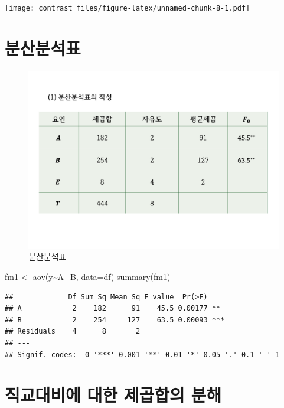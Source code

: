 \documentclass[
]{book}
\newenvironment{Shaded}{\begin{snugshade}}{\end{snugshade}}
\newcommand{\AttributeTok}[1]{\textcolor[rgb]{0.77,0.63,0.00}{#1}}
\newcommand{\FunctionTok}[1]{\textcolor[rgb]{0.00,0.00,0.00}{#1}}
\newcommand{\NormalTok}[1]{#1}
\newcommand{\OtherTok}[1]{\textcolor[rgb]{0.56,0.35,0.01}{#1}}
\newcommand{\SpecialCharTok}[1]{\textcolor[rgb]{0.00,0.00,0.00}{#1}}
\begin{document}
\texttt{[image: contrast\_files/figure-latex/unnamed-chunk-8-1.pdf]}

\hypertarget{uxbd84uxc0b0uxbd84uxc11duxd45c}{%
\section{분산분석표}\label{uxbd84uxc0b0uxbd84uxc11duxd45c}}

\begin{figure}
\centering
\includegraphics{slide02.png}
\caption{분산분석표}
\end{figure}

\begin{Shaded}
\begin{Highlighting}[]
\NormalTok{fm1 }\OtherTok{\textless{}{-}} \FunctionTok{aov}\NormalTok{(y}\SpecialCharTok{\textasciitilde{}}\NormalTok{A}\SpecialCharTok{+}\NormalTok{B, }\AttributeTok{data=}\NormalTok{df)}
\FunctionTok{summary}\NormalTok{(fm1)}
\end{Highlighting}
\end{Shaded}

\begin{verbatim}
##             Df Sum Sq Mean Sq F value  Pr(>F)    
## A            2    182      91    45.5 0.00177 ** 
## B            2    254     127    63.5 0.00093 ***
## Residuals    4      8       2                    
## ---
## Signif. codes:  0 '***' 0.001 '**' 0.01 '*' 0.05 '.' 0.1 ' ' 1
\end{verbatim}

\newpage

\hypertarget{uxc9c1uxad50uxb300uxbe44uxc5d0-uxb300uxd55c-uxc81cuxacf1uxd569uxc758-uxbd84uxd574}{%
\section{직교대비에 대한 제곱합의 분해}\label{uxc9c1uxad50uxb300uxbe44uxc5d0-uxb300uxd55c-uxc81cuxacf1uxd569uxc758-uxbd84uxd574}}
\end{document}
